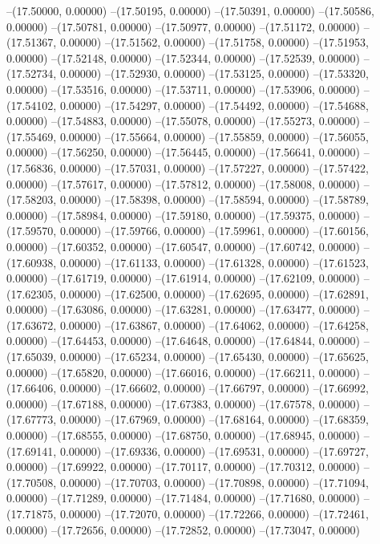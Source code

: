 --(17.50000, 0.00000)
--(17.50195, 0.00000)
--(17.50391, 0.00000)
--(17.50586, 0.00000)
--(17.50781, 0.00000)
--(17.50977, 0.00000)
--(17.51172, 0.00000)
--(17.51367, 0.00000)
--(17.51562, 0.00000)
--(17.51758, 0.00000)
--(17.51953, 0.00000)
--(17.52148, 0.00000)
--(17.52344, 0.00000)
--(17.52539, 0.00000)
--(17.52734, 0.00000)
--(17.52930, 0.00000)
--(17.53125, 0.00000)
--(17.53320, 0.00000)
--(17.53516, 0.00000)
--(17.53711, 0.00000)
--(17.53906, 0.00000)
--(17.54102, 0.00000)
--(17.54297, 0.00000)
--(17.54492, 0.00000)
--(17.54688, 0.00000)
--(17.54883, 0.00000)
--(17.55078, 0.00000)
--(17.55273, 0.00000)
--(17.55469, 0.00000)
--(17.55664, 0.00000)
--(17.55859, 0.00000)
--(17.56055, 0.00000)
--(17.56250, 0.00000)
--(17.56445, 0.00000)
--(17.56641, 0.00000)
--(17.56836, 0.00000)
--(17.57031, 0.00000)
--(17.57227, 0.00000)
--(17.57422, 0.00000)
--(17.57617, 0.00000)
--(17.57812, 0.00000)
--(17.58008, 0.00000)
--(17.58203, 0.00000)
--(17.58398, 0.00000)
--(17.58594, 0.00000)
--(17.58789, 0.00000)
--(17.58984, 0.00000)
--(17.59180, 0.00000)
--(17.59375, 0.00000)
--(17.59570, 0.00000)
--(17.59766, 0.00000)
--(17.59961, 0.00000)
--(17.60156, 0.00000)
--(17.60352, 0.00000)
--(17.60547, 0.00000)
--(17.60742, 0.00000)
--(17.60938, 0.00000)
--(17.61133, 0.00000)
--(17.61328, 0.00000)
--(17.61523, 0.00000)
--(17.61719, 0.00000)
--(17.61914, 0.00000)
--(17.62109, 0.00000)
--(17.62305, 0.00000)
--(17.62500, 0.00000)
--(17.62695, 0.00000)
--(17.62891, 0.00000)
--(17.63086, 0.00000)
--(17.63281, 0.00000)
--(17.63477, 0.00000)
--(17.63672, 0.00000)
--(17.63867, 0.00000)
--(17.64062, 0.00000)
--(17.64258, 0.00000)
--(17.64453, 0.00000)
--(17.64648, 0.00000)
--(17.64844, 0.00000)
--(17.65039, 0.00000)
--(17.65234, 0.00000)
--(17.65430, 0.00000)
--(17.65625, 0.00000)
--(17.65820, 0.00000)
--(17.66016, 0.00000)
--(17.66211, 0.00000)
--(17.66406, 0.00000)
--(17.66602, 0.00000)
--(17.66797, 0.00000)
--(17.66992, 0.00000)
--(17.67188, 0.00000)
--(17.67383, 0.00000)
--(17.67578, 0.00000)
--(17.67773, 0.00000)
--(17.67969, 0.00000)
--(17.68164, 0.00000)
--(17.68359, 0.00000)
--(17.68555, 0.00000)
--(17.68750, 0.00000)
--(17.68945, 0.00000)
--(17.69141, 0.00000)
--(17.69336, 0.00000)
--(17.69531, 0.00000)
--(17.69727, 0.00000)
--(17.69922, 0.00000)
--(17.70117, 0.00000)
--(17.70312, 0.00000)
--(17.70508, 0.00000)
--(17.70703, 0.00000)
--(17.70898, 0.00000)
--(17.71094, 0.00000)
--(17.71289, 0.00000)
--(17.71484, 0.00000)
--(17.71680, 0.00000)
--(17.71875, 0.00000)
--(17.72070, 0.00000)
--(17.72266, 0.00000)
--(17.72461, 0.00000)
--(17.72656, 0.00000)
--(17.72852, 0.00000)
--(17.73047, 0.00000)
